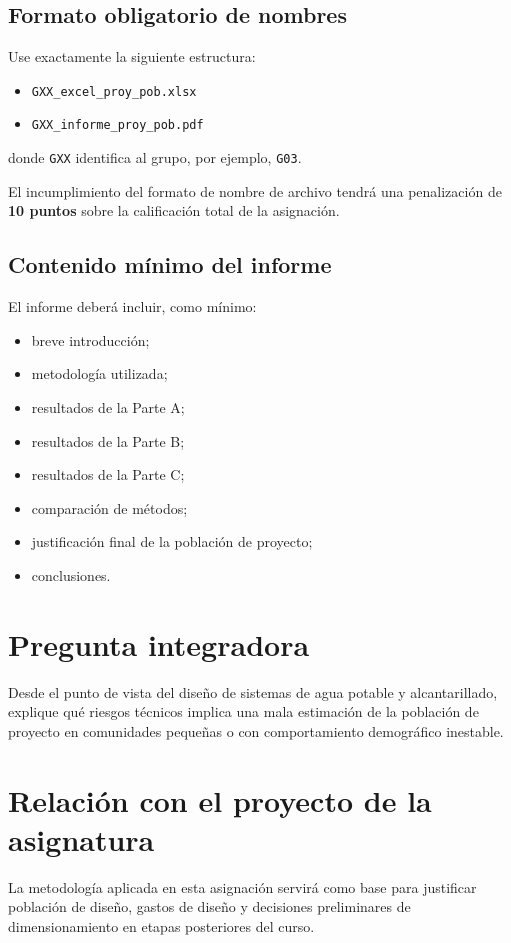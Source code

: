 \documentclass[11pt]{scrartcl}
\begin{document}
\subsection{Formato obligatorio de nombres}
Use exactamente la siguiente estructura:
\begin{itemize}
  \item \texttt{GXX\_excel\_proy\_pob.xlsx}
  \item \texttt{GXX\_informe\_proy\_pob.pdf}
\end{itemize}
donde \texttt{GXX} identifica al grupo, por ejemplo, \texttt{G03}.

\begin{icvwarning}[Entrega]
El incumplimiento del formato de nombre de archivo tendrá una
penalización de \textbf{10 puntos} sobre la calificación total de la
asignación.
\end{icvwarning}

\subsection{Contenido mínimo del informe}
El informe deberá incluir, como mínimo:
\begin{itemize}
  \item breve introducción;
  \item metodología utilizada;
  \item resultados de la Parte A;
  \item resultados de la Parte B;
  \item resultados de la Parte C;
  \item comparación de métodos;
  \item justificación final de la población de proyecto;
  \item conclusiones.
\end{itemize}

\section{Pregunta integradora}
Desde el punto de vista del diseño de sistemas de agua potable y
alcantarillado, explique qué riesgos técnicos implica una mala
estimación de la población de proyecto en comunidades pequeñas o con
comportamiento demográfico inestable.

\section{Relación con el proyecto de la asignatura}
La metodología aplicada en esta asignación servirá como base para
justificar población de diseño, gastos de diseño y decisiones
preliminares de dimensionamiento en etapas posteriores del curso.
\end{document}
